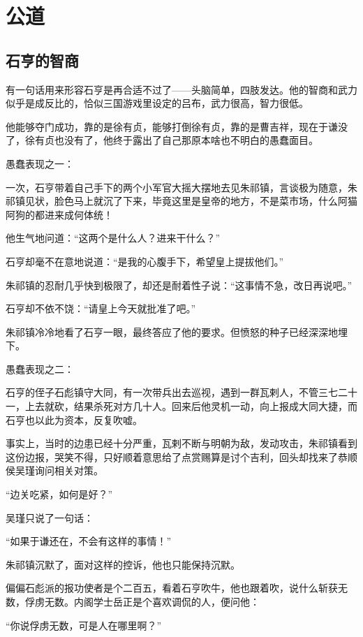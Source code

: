 \section{公道}
\ifnum{}
	\begin{multicols}{\theparacolNo}
		\fi
		\subsection{石亨的智商}
		有一句话用来形容石亨是再合适不过了——头脑简单，四肢发达。他的智商和武力似乎是成反比的，恰似三国游戏里设定的吕布，武力很高，智力很低。

		他能够夺门成功，靠的是徐有贞，能够打倒徐有贞，靠的是曹吉祥，现在于谦没了，徐有贞也没有了，他终于露出了自己那原本啥也不明白的愚蠢面目。

		愚蠢表现之一：

		一次，石亨带着自己手下的两个小军官大摇大摆地去见朱祁镇，言谈极为随意，朱祁镇见状，脸色马上就沉了下来，毕竟这里是皇帝的地方，不是菜市场，什么阿猫阿狗的都进来成何体统！

		他生气地问道：“这两个是什么人？进来干什么？”

		石亨却毫不在意地说道：“是我的心腹手下，希望皇上提拔他们。”

		朱祁镇的忍耐几乎快到极限了，却还是耐着性子说：“这事情不急，改日再说吧。”

		石亨却不依不饶：“请皇上今天就批准了吧。”

		朱祁镇冷冷地看了石亨一眼，最终答应了他的要求。但愤怒的种子已经深深地埋下。

		愚蠢表现之二：

		石亨的侄子石彪镇守大同，有一次带兵出去巡视，遇到一群瓦剌人，不管三七二十一，上去就砍，结果杀死对方几十人。回来后他灵机一动，向上报成大同大捷，而石亨也以此为资本，反复吹嘘。

		事实上，当时的边患已经十分严重，瓦剌不断与明朝为敌，发动攻击，朱祁镇看到这份边报，哭笑不得，只好顺着意思给了点赏赐算是讨个吉利，回头却找来了恭顺侯吴瑾询问相关对策。

		“边关吃紧，如何是好？”

		吴瑾只说了一句话：

		“如果于谦还在，不会有这样的事情！”

		朱祁镇沉默了，面对这样的控诉，他也只能保持沉默。

		偏偏石彪派的报功使者是个二百五，看着石亨吹牛，他也跟着吹，说什么斩获无数，俘虏无数。内阁学士岳正是个喜欢调侃的人，便问他：

		“你说俘虏无数，可是人在哪里啊？”


\end{multicols}
